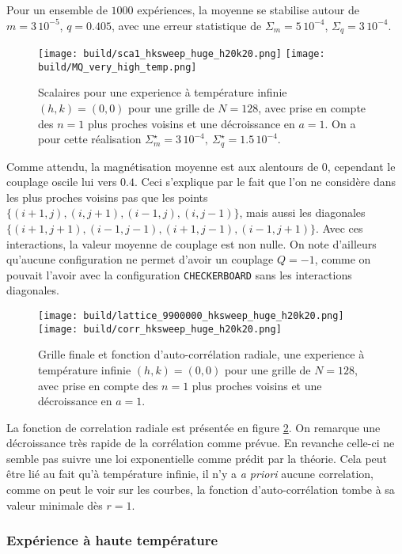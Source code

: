 \documentclass[a4paper, 11pt]{article}
\begin{document}
Pour un ensemble de $1000$ expériences, la moyenne se stabilise autour de $m=3\,10^{-5}$, $q=0.405$,
avec une erreur statistique de $\Sigma_m = 5\,10^{-4}$, $\Sigma_q = 3\,10^{-4}$.

\begin{figure}
    \centering
    \texttt{[image: build/sca1\_hksweep\_huge\_h20k20.png]}
    \texttt{[image: build/MQ\_very\_high\_temp.png]}
    \caption{Scalaires pour une experience à température infinie $(h, k) = (0, 0)$ pour une grille de
    $N=128$, avec prise en compte des $n=1$ plus proches voisins et une décroissance en $a=1$. On a
    pour cette réalisation $\Sigma_m^\star = 3\,10^{-4},~ \Sigma_q^\star = 1.5\,10^{-4}$.}
    \label{fig:inf_en_sca}
\end{figure}

Comme attendu, la magnétisation moyenne est aux alentours de $0$, cependant le couplage oscile lui
vers $0.4$. Ceci s'explique par le fait que l'on ne considère dans les plus proches voisins pas que
les points $\{(i+1, j), (i, j+1), (i-1, j), (i, j-1)\}$, mais aussi les diagonales $\{(i+1, j+1),
(i-1, j-1), (i+1, j-1), (i-1, j+1)\}$. Avec ces interactions, la valeur moyenne de couplage est non
nulle. On note d'ailleurs qu'aucune configuration ne permet d'avoir un couplage $Q=-1$, comme on
pouvait l'avoir avec la configuration \texttt{CHECKERBOARD} sans les interactions diagonales. 

\begin{figure}
    \centering
    \texttt{[image: build/lattice\_9900000\_hksweep\_huge\_h20k20.png]}
    \texttt{[image: build/corr\_hksweep\_huge\_h20k20.png]}
    \caption{Grille finale et fonction d'auto-corrélation radiale, une experience à température
    infinie $(h, k) = (0, 0)$ pour une grille de $N=128$, avec prise en compte des $n=1$ plus
    proches voisins et une décroissance en $a=1$. } 
    \label{fig:inf_en_corr}
\end{figure}

La fonction de correlation radiale est présentée en figure \ref{fig:inf_en_corr}. On remarque une
décroissance très rapide de la corrélation comme prévue. En revanche celle-ci ne semble pas suivre
une loi exponentielle comme prédit par la théorie. Cela peut être lié au fait qu'à température
infinie, il n'y a \emph{a priori} aucune correlation, comme on peut le voir sur les courbes, la
fonction d'auto-corrélation tombe à sa valeur minimale dès $r=1$.

\subsubsection{Expérience à haute température}
\end{document}
